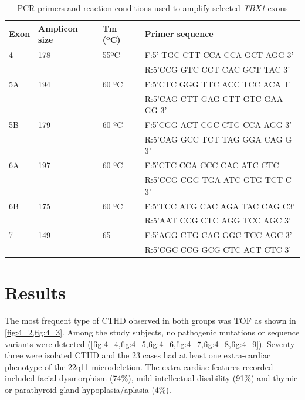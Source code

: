 \begin{refsection}
\begin{table}[!thbp]
\centering
\caption{PCR primers and reaction conditions used to amplify selected \textit{TBX1} exons \cite{Cabuk2007}}
\label{tab:4.1primers}
\begin{tabular}{  l  l  l  l  }
\toprule
	\textbf{Exon} & \textbf{Amplicon size} & \textbf{Tm (ºC)} & \textbf{Primer sequence} \\ \toprule
	4 & 178 & 55ºC & F:5’ TGC CTT CCA CCA GCT AGG 3’ \\ 
	 &  &  & R:5’CCG GTC CCT CAC GCT TAC 3’ \\ \midrule
	5A & 194 & 60 ºC & F:5’CTC GGG TTC ACC TCC ACA T \\ 
	 &  &  & R:5’CAG CTT GAG CTT GTC GAA GG 3’ \\ \midrule
	5B & 179 & 60 ºC & F:5’CGG ACT CGC CTG CCA AGG 3’ \\ 
	 &  &  & R:5’CAG GCC TCT TAG GGA CAG G 3’ \\ \midrule
	6A & 197 & 60 ºC & F:5’CTC CCA CCC CAC ATC CTC \\ 
	 &  &  & R:5’CCG CGG TGA ATC GTG TCT C 3’ \\ \midrule
	6B & 175 & 60 ºC & F:5’TCC ATG CAC AGA TAC CAG C3’ \\ 
	 &  &  & R:5’AAT CCG CTC AGG TCC AGC 3’ \\ \midrule
	7 & 149 & 65 & F:5’AGG CTG CAG GGC TCC AGC 3’ \\ 
	 &  &  & R:5’CGC CCG GCG CTC ACT CTC 3’ \\ \bottomrule
\end{tabular}
\end{table}

\section{Results}
The most frequent type of CTHD observed in both groups was TOF as shown in \cref{fig:4_2,fig:4_3}. Among the study subjects, no pathogenic mutations or sequence variants were detected (\cref{fig:4_4,fig:4_5,fig:4_6,fig:4_7,fig:4_8,fig:4_9}). Seventy three were isolated CTHD and the 23 cases had at least one extra-cardiac phenotype of the 22q11 microdeletion. The extra-cardiac features recorded included facial dysmorphism (74\%), mild intellectual disability (91\%) and thymic or parathyroid gland hypoplasia/aplasia (4\%). 



\end{refsection}
